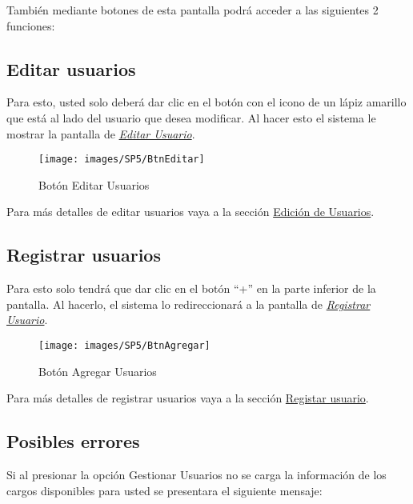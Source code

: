         También mediante botones de esta pantalla podrá acceder a las siguientes 2 funciones:

        \subsection{Editar usuarios}

            Para esto, usted solo deberá dar clic en el botón con el icono de un lápiz amarillo que está al lado del usuario que desea modificar. Al hacer esto el sistema le mostrar la pantalla   de \hyperlink{editarUs}{\textit{Editar Usuario}}.
            
            \begin{figure}[!hbtp]
                \centering
                \hypertarget{editar}{\texttt{[image: images/SP5/BtnEditar]}}
                \caption{Botón Editar Usuarios}
                \label{editar}
            \end{figure}
            
            Para más detalles de editar usuarios vaya a la sección \hyperref[editar-user]{Edición de Usuarios}.
        
        \subsection{Registrar  usuarios}

            Para esto solo tendrá que dar clic en el botón “+” en la parte inferior de la pantalla. Al hacerlo, el sistema  lo redireccionará a la pantalla de \hyperlink{registrarUs}{\textit{Registrar Usuario}}.
        
            \begin{figure}[!hbtp]
                \centering
                \hypertarget{add}{\texttt{[image: images/SP5/BtnAgregar]}}
                \caption{Botón Agregar Usuarios}
                \label{add}
            \end{figure}
    
            Para más detalles de registrar usuarios vaya a la sección \hyperref[registrarUs]{Registar usuario}.
            
        \subsection{Posibles errores}
    
            Si al  presionar la opción Gestionar Usuarios no se carga la información de los cargos disponibles para usted se presentara el siguiente mensaje:
            
